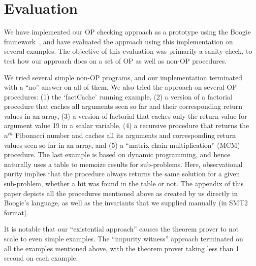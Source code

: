 \section{Evaluation}\label{sec:experiments}

We have implemented our OP checking approach as a prototype using the Boogie
framework~\cite{leino2008boogie}, and have evaluated the approach using
this implementation on several examples. The objective of this evaluation
was primarily a sanity check, to test how our approach does on a set of
OP as well as non-OP procedures.

We tried several simple non-OP programs, and our implementation terminated
with a ``no'' answer on all of them.  We also tried the approach on several
OP procedures: (1) the `factCache' running example, (2) a version of
a factorial procedure that caches all arguments seen so far and their
corresponding return values in an array, (3) a version of factorial that caches
only the return value for argument value 19 in a scalar variable, (4) a
recursive procedure that returns the $n^\mathit{th}$ Fibonacci number and
caches all its arguments and corresponding return values seen so far in an
array, and (5) a ``matrix chain multiplication'' (MCM) procedure.
The last example  is based
on dynamic programming, and hence naturally uses a table to memoize 
results for sub-problems. Here, observational purity implies that the procedure always
returns the same solution for a given sub-problem, whether a hit was found
in the table or not.  The appendix of this paper depicts all the procedures
mentioned above as created by us directly in Boogie's language, as well as
the invariants that we supplied manually (in  SMT2
format).


It is notable that our ``existential approach'' causes the theorem prover
to not scale to even simple examples. The ``impurity witness'' approach
terminated on all the examples mentioned above, with the theorem prover
taking less than 1 second on each example.

